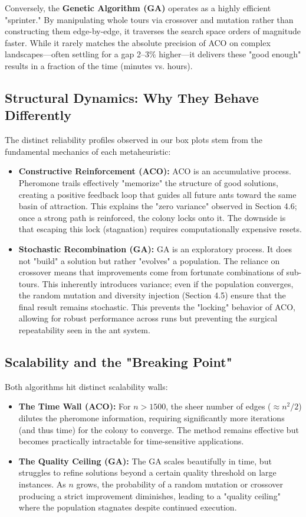 \documentclass[11pt,a4paper]{article}
\begin{document}
Conversely, the \textbf{Genetic Algorithm (GA)} operates as a highly efficient "sprinter." By manipulating whole tours via crossover and mutation rather than constructing them edge-by-edge, it traverses the search space orders of magnitude faster. While it rarely matches the absolute precision of ACO on complex landscapes—often settling for a gap 2--3\% higher—it delivers these "good enough" results in a fraction of the time (minutes vs. hours).

\subsection{Structural Dynamics: Why They Behave Differently}
The distinct reliability profiles observed in our box plots stem from the fundamental mechanics of each metaheuristic:
\begin{itemize}[nosep]
  \item \textbf{Constructive Reinforcement (ACO):} ACO is an accumulative process. Pheromone trails effectively "memorize" the structure of good solutions, creating a positive feedback loop that guides all future ants toward the same basin of attraction. This explains the "zero variance" observed in Section 4.6; once a strong path is reinforced, the colony locks onto it. The downside is that escaping this lock (stagnation) requires computationally expensive resets.
  \item \textbf{Stochastic Recombination (GA):} GA is an exploratory process. It does not "build" a solution but rather "evolves" a population. The reliance on crossover means that improvements come from fortunate combinations of sub-tours. This inherently introduces variance; even if the population converges, the random mutation and diversity injection (Section 4.5) ensure that the final result remains stochastic. This prevents the "locking" behavior of ACO, allowing for robust performance across runs but preventing the surgical repeatability seen in the ant system.
\end{itemize}

\subsection{Scalability and the "Breaking Point"}
Both algorithms hit distinct scalability walls:
\begin{itemize}[nosep]
  \item \textbf{The Time Wall (ACO):} For $n > 1500$, the sheer number of edges ($\approx n^2/2$) dilutes the pheromone information, requiring significantly more iterations (and thus time) for the colony to converge. The method remains effective but becomes practically intractable for time-sensitive applications.
  \item \textbf{The Quality Ceiling (GA):} The GA scales beautifully in time, but struggles to refine solutions beyond a certain quality threshold on large instances. As $n$ grows, the probability of a random mutation or crossover producing a strict improvement diminishes, leading to a "quality ceiling" where the population stagnates despite continued execution.
\end{itemize}
\end{document}
